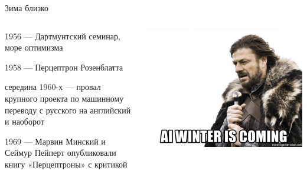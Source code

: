 \documentclass[notes,12pt, aspectratio=169]{beamer}
\newenvironment{wideitemize}{\itemize\addtolength{\itemsep}{10pt}}{\enditemize}
\begin{document}
\begin{frame}{Зима близко}
\begin{columns}[T] 
\begin{column}{.5\textwidth}
\begin{wideitemize} 
\item 1956 — Дартмунтский семинар, море оптимизма

\item 1958 — Перцептрон Розенблатта

\item середина 1960-х — провал крупного проекта по машинному переводу с русского на английский и наоборот 

\item 1969 — Марвин Минский и Сеймур Пейперт опубликовали книгу «Перцептроны» с критикой 

\end{wideitemize} 
\end{column}%
\hfill%
\begin{column}{.5\textwidth}
\begin{center}
\includegraphics[width=.99\linewidth]{stark.jpg}
\end{center}
\end{column}%
\end{columns}
\end{frame}
\end{document}
